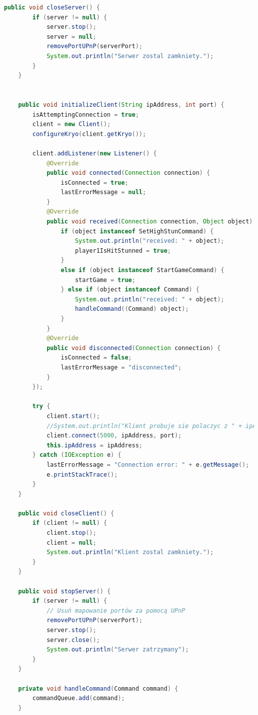 \begin{lstlisting}[language=Java,style=JavaStyle,label=list:multiplayer,caption=Klasa \texttt{Multiplayer},
                   basicstyle=\footnotesize\ttfamily]
    public void closeServer() {
        if (server != null) {
            server.stop();
            server = null;
            removePortUPnP(serverPort);
            System.out.println("Serwer zostal zamkniety.");
        }
    }


    public void initializeClient(String ipAddress, int port) {
        isAttemptingConnection = true;
        client = new Client();
        configureKryo(client.getKryo());

        client.addListener(new Listener() {
            @Override
            public void connected(Connection connection) {
                isConnected = true;
                lastErrorMessage = null;
            }
            @Override
            public void received(Connection connection, Object object) {
                if (object instanceof SetHighStunCommand) {
                    System.out.println("received: " + object);
                    player1IsHitStunned = true;
                }
                else if (object instanceof StartGameCommand) {
                    startGame = true;
                } else if (object instanceof Command) {
                    System.out.println("received: " + object);
                    handleCommand((Command) object);
                }
            }
            @Override
            public void disconnected(Connection connection) {
                isConnected = false;
                lastErrorMessage = "disconnected";
            }
        });

        try {
            client.start();
            //System.out.println("Klient probuje sie polaczyc z " + ipAddress + "/" + port);
            client.connect(5000, ipAddress, port);
            this.ipAddress = ipAddress;
        } catch (IOException e) {
            lastErrorMessage = "Connection error: " + e.getMessage();
            e.printStackTrace();
        }
    }

    public void closeClient() {
        if (client != null) {
            client.stop();
            client = null;
            System.out.println("Klient zostal zamkniety.");
        }
    }

    public void stopServer() {
        if (server != null) {
            // Usuń mapowanie portów za pomocą UPnP
            removePortUPnP(serverPort);
            server.stop();
            server.close();
            System.out.println("Serwer zatrzymany");
        }
    }

    private void handleCommand(Command command) {
        commandQueue.add(command);
    }


\end{lstlisting}
